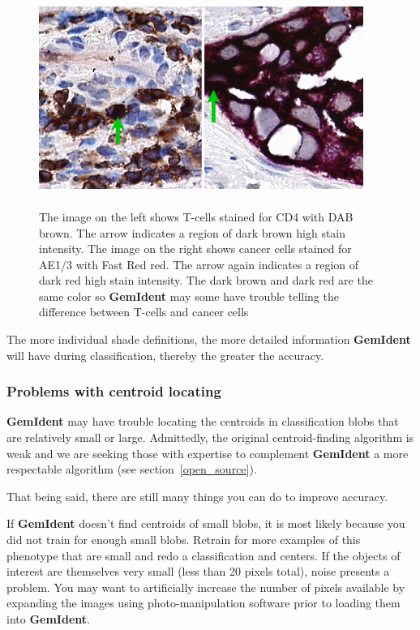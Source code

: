 \documentclass[12pt]{article}
\begin{document}
\begin{figure}[htp]
\centering
\includegraphics[width=300pt,height=178pt]{samecolors.jpg}
\label{fig:samecolors}
\caption{\sf The image on the left shows T-cells stained for CD4 with DAB brown. The arrow indicates a region of dark brown high stain intensity. The image on the right shows cancer cells stained for AE1/3 with Fast Red red. The arrow again indicates a region of dark red high stain intensity. The dark brown and dark red are the same color so {\bf GemIdent} may some have trouble telling the difference between T-cells and cancer cells}
\end{figure}

The more individual shade definitions, the more detailed information {\bf GemIdent} will have during classification, thereby the greater the accuracy.

\subsubsection{Problems with centroid locating}

{\bf GemIdent} may have trouble locating the centroids in classification blobs that are relatively small or large. Admittedly, the original centroid-finding algorithm is weak and we are seeking those with expertise to complement {\bf GemIdent} a more respectable algorithm (see section~\ref{open_source}).

That being said, there are still many things you can do to improve accuracy. 

If {\bf GemIdent} doesn't find centroids of small blobs, it is most likely because you did not train for enough small blobs. Retrain for more examples of this phenotype that are small and redo a classification and centers. If the objects of interest are themselves very small (less than 20 pixels total), noise presents a problem. You may want to artificially increase the number of pixels available by expanding the images using photo-manipulation software prior to loading them into {\bf GemIdent}.
\end{document}
